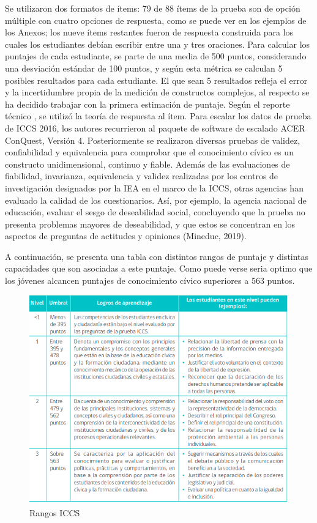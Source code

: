 \documentclass[12pt,twoside]{templates/facsothesis}
\begin{document}
Se utilizaron dos formatos de ítems: 79 de 88 ítems de la prueba son de opción múltiple con cuatro opciones de respuesta, como se puede ver en los ejemplos de los Anexos; los nueve ítems restantes fueron de respuesta construida para los cuales los estudiantes debían escribir entre una y tres oraciones. Para calcular los puntajes de cada estudiante, se parte de una media de 500 puntos, considerando una desviación estándar de 100 puntos, y según esta métrica se calculan 5 posibles resultados para cada estudiante. El que sean 5 resultados refleja el error y la incertidumbre propia de la medición de constructos complejos, al respecto se ha decidido trabajar con la primera estimación de puntaje. Según el reporte técnico \citep{schulz_ICCS_2016}, se utilizó la teoría de respuesta al ítem. Para escalar los datos de prueba de ICCS 2016, los autores recurrieron al paquete de software de escalado ACER ConQuest, Versión 4. Posteriormente se realizaron diversas pruebas de validez, confiabilidad y equivalencia para comprobar que el conocimiento cívico es un constructo unidimensional, continuo y fiable.
Además de las evaluaciones de fiabilidad, invarianza, equivalencia y validez realizadas por los centros de investigación designados por la IEA en el marco de la ICCS, otras agencias han evaluado la calidad de los cuestionarios. Así, por ejemplo, la agencia nacional de educación, evaluar el sesgo de deseabilidad social, concluyendo que la prueba no presenta problemas mayores de deseabilidad, y que estos se concentran en los aspectos de preguntas de actitudes y opiniones (Mineduc, 2019).

A continuación, se presenta una tabla con distintos rangos de puntaje y distintas capacidades que son asociadas a este puntaje. Como puede verse seria optimo que los jóvenes alcancen puntajes de conocimiento cívico superiores a 563 puntos.

\begin{figure}

{\centering \includegraphics[width=0.8\linewidth]{images/puntajesdecorteiccs} 

}

\caption{Rangos ICCS}\label{fig:unnamed-chunk-3}
\end{figure}
\end{document}
